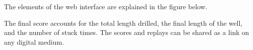 
The elements of the web interface are explained in the figure below.




The final score accounts for the total length drilled, the final length of the well, and the number of stuck times. 
The scores and replays can be shared as a link on any digital medium.